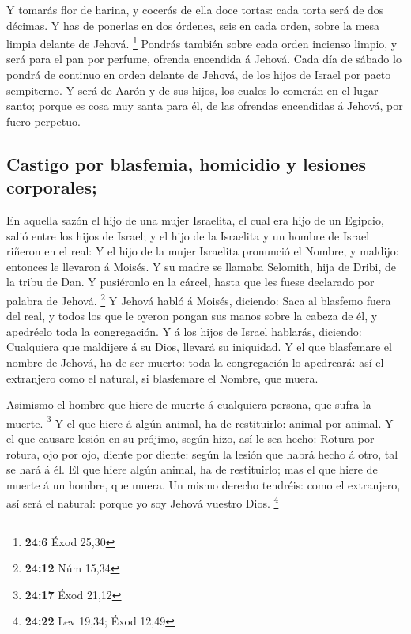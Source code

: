  Y tomarás flor de harina, y cocerás de ella doce tortas:
cada torta será de dos décimas.  Y has de ponerlas en dos
órdenes, seis en cada orden, sobre la mesa limpia delante de Jehová.
\footnote{\textbf{24:6} Éxod 25,30}  Pondrás también sobre
cada orden incienso limpio, y será para el pan por perfume, ofrenda
encendida á Jehová.  Cada día de sábado lo pondrá de
continuo en orden delante de Jehová, de los hijos de Israel por pacto
sempiterno.  Y será de Aarón y de sus hijos, los cuales lo
comerán en el lugar santo; porque es cosa muy santa para él, de las
ofrendas encendidas á Jehová, por fuero perpetuo.

\hypertarget{castigo-por-blasfemia-homicidio-y-lesiones-corporales}{%
\subsection{Castigo por blasfemia, homicidio y lesiones
corporales;}\label{castigo-por-blasfemia-homicidio-y-lesiones-corporales}}

 En aquella sazón el hijo de una mujer Israelita, el cual
era hijo de un Egipcio, salió entre los hijos de Israel; y el hijo de la
Israelita y un hombre de Israel riñeron en el real:  Y el
hijo de la mujer Israelita pronunció el Nombre, y maldijo: entonces le
llevaron á Moisés. Y su madre se llamaba Selomith, hija de Dribi, de la
tribu de Dan.  Y pusiéronlo en la cárcel, hasta que les
fuese declarado por palabra de Jehová. \footnote{\textbf{24:12} Núm
  15,34}  Y Jehová habló á Moisés, diciendo:
 Saca al blasfemo fuera del real, y todos los que le
oyeron pongan sus manos sobre la cabeza de él, y apedréelo toda la
congregación.  Y á los hijos de Israel hablarás,
diciendo: Cualquiera que maldijere á su Dios, llevará su iniquidad.
 Y el que blasfemare el nombre de Jehová, ha de ser
muerto: toda la congregación lo apedreará: así el extranjero como el
natural, si blasfemare el Nombre, que muera.

 Asimismo el hombre que hiere de muerte á cualquiera
persona, que sufra la muerte. \footnote{\textbf{24:17} Éxod 21,12}
 Y el que hiere á algún animal, ha de restituirlo: animal
por animal.  Y el que causare lesión en su prójimo, según
hizo, así le sea hecho:  Rotura por rotura, ojo por ojo,
diente por diente: según la lesión que habrá hecho á otro, tal se hará á
él.  El que hiere algún animal, ha de restituirlo; mas el
que hiere de muerte á un hombre, que muera.  Un mismo
derecho tendréis: como el extranjero, así será el natural: porque yo soy
Jehová vuestro Dios. \footnote{\textbf{24:22} Lev 19,34; Éxod 12,49}

